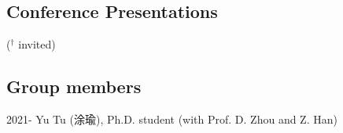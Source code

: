 \documentclass[10pt]{article}
\begin{document}
\vspace{+0.1in}

{\small
\begin{etaremune}
\item 
\end{etaremune}

}

\subsection*{Conference Presentations}({\small $\boldsymbol {^\dagger}$ invited) }
{\small
\begin{etaremune}
\item 

\end{etaremune}
}

\subsection*{Group members}
2021- Yu Tu (涂瑜), Ph.D. student (with Prof. D. Zhou and Z. Han)

\end{document}

